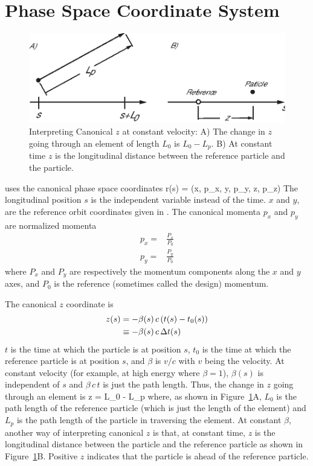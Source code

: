\section{Phase Space Coordinate System}
\label{s:phase_space_coords}

\begin{figure}
\centering 
\includegraphics{canonical_z.eps} 
\caption[Interpreting Canonical $z$ at constant velocity.]
{Interpreting Canonical $z$ at constant velocity: A) The change in $z$
going through an element of length $L_0$ is $L_0 - L_p$.  B) At
constant time $z$ is the longitudinal distance between the reference
particle and the particle.}
\label{f:canonical_z}
\end{figure}

\bmad uses the canonical phase space coordinates 
\Begineq
  \Bf r(s) = (x, p_x, y, p_y, z, p_z)
\Endeq
The longitudinal position $s$ is the independent variable instead of
the time.  $x$ and $y$, are the reference orbit coordinates given in
.  The canonical momenta $p_x$ and $p_y$ are
normalized momenta
\begin{align}
  p_x = &\frac{P_x}{P_0} \\
  p_y = &\frac{P_y}{P_0}
\end{align}
where $P_x$ and $P_y$ are respectively the momentum components along
the $x$ and $y$ axes, and $P_0$ is the reference (sometimes called the
design) momentum.

The canonical $z$ coordinate is 
\begin{align}
  z(s) &= -\beta(s) \, c \, (t(s) - t_0(s)) \nonumber \\
    &\equiv - \beta(s) \, c \, \Delta t(s)
  \label{zbctt}
\end{align}
$t$ is the time at which the particle is at position $s$, $t_0$ is the
time at which the reference particle is at position $s$, and $\beta$ is
$v/c$ with $v$ being the velocity. At constant velocity (for
example, at high energy where $\beta = 1$), $\beta(s)$ is independent
of $s$ and $\beta \, c \, t$ is just the path length. Thus, the change in
$z$ going through an element is
\Begineq
  \Delta z = L_0 - L_p
\Endeq
where, as shown in Figure~\ref{f:canonical_z}A, $L_0$ is the path
length of the reference particle (which is just the length of the
element) and $L_p$ is the path length of the particle in traversing the
element. At constant $\beta$, another way of interpreting canonical $z$
is that, at constant time, $z$ is the longitudinal distance between the
particle and the reference particle as shown in
Figure~\ref{f:canonical_z}B. Positive $z$ indicates that the particle
is ahead of the reference particle.

